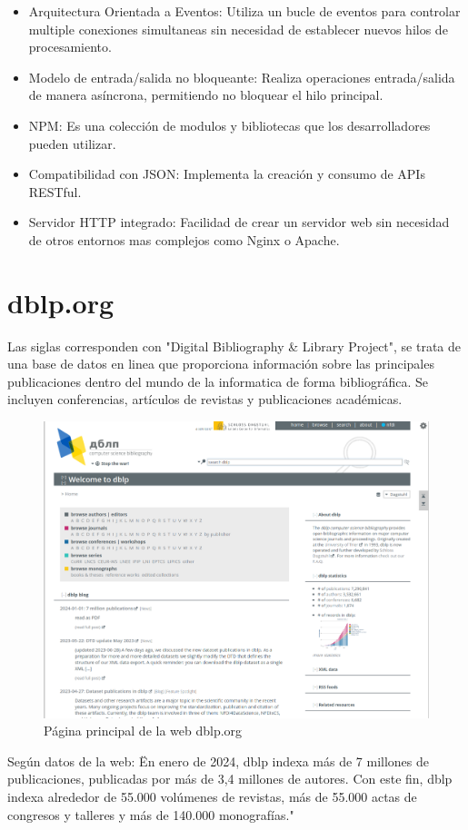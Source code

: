 \documentclass[a4paper, 12pt]{book}
\begin{document}
\begin{itemize}
    \item Arquitectura Orientada a Eventos: Utiliza un bucle de eventos para controlar multiple conexiones simultaneas sin necesidad de establecer nuevos hilos de procesamiento.
    \item Modelo de entrada/salida no bloqueante: Realiza operaciones entrada/salida de manera asíncrona, permitiendo no bloquear el hilo principal.
    \item NPM: Es una colección de modulos y bibliotecas que los desarrolladores pueden utilizar.
    \item Compatibilidad con JSON: Implementa la creación y consumo de APIs RESTful.
    \item Servidor HTTP integrado: Facilidad de crear un servidor web sin necesidad de otros entornos mas complejos como Nginx o Apache.
\end{itemize}

\section{dblp.org}
Las siglas corresponden con "Digital Bibliography \& Library Project", se trata de una base de datos en linea que proporciona información sobre las principales publicaciones dentro del mundo de la informatica de forma bibliográfica. Se incluyen conferencias, artículos de revistas y publicaciones académicas. 

\begin{figure}[h]
  \centering
  \includegraphics[width=16cm, keepaspectratio]{img/dblp_frontpage.png}
  \caption{Página principal de la web dblp.org}
  \label{fig:web}
\end{figure}
Según datos de la web: \" En enero de 2024, dblp indexa más de 7 millones de publicaciones, publicadas por más de 3,4 millones de autores. Con este fin, dblp indexa alrededor de 55.000 volúmenes de revistas, más de 55.000 actas de congresos y talleres y más de 140.000 monografías."
\end{document}
